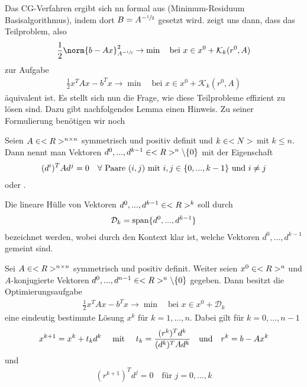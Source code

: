 Das CG-Verfahren ergibt sich nn formal aus  (Minimum-Residuum Basisalgorithmus), indem dort $B=A^{-\sfrac{1}{2}}$ gesetzt wird.  zeigt uns dann, dass das Teilproblem, also
\begin{align}
	\label{2_13}
	\frac{1}{2}\norm{b-Ax}^2_{A^{-\sfrac{1}{2}}}\to\min\quad\text{bei } x\in x^0+\mathcal{K}_k(r^0,A)
\end{align}
zur Aufgabe
\begin{align}
	\label{2_14}
	\frac{1}{2}x^TAx-b^Tx\to\min\quad\text{bei } x\in x^0+\mathcal{K}_k(r^0,A)
\end{align}
äquivalent ist. Es stellt sich nun die Frage, wie diese Teilprobleme effizient zu lösen sind. Dazu gibt nachfolgendes Lemma einen Hinweis. Zu seiner Formulierung benötigen wir noch

\begin{definition}
	Seien $A\in<R>^{n \times n}$ symmetrisch und positiv definit und $k\in<N>$ mit $k\le n$. Dann nennt man Vektoren $d^0,...,d^{k-1}\in<R>^n\backslash\{0\}$ mit der Eigenschaft
	\begin{align}
		(d^i)^TAd^j=0\quad\forall\text{ Paare } (i,j) \text{ mit } i,j\in\{0,...,k-1\} \text{ und } i\neq j\notag
	\end{align}
	 oder .
\end{definition}

Die lineare Hülle von Vektoren $d^0,...,d^{k-1}\in<R>^k$ soll durch 
\begin{align}
	\mathcal{D}_k=\operatorname{span}\{d^0,...,d^{k-1}\}\notag
\end{align}
bezeichnet werden, wobei durch den Kontext klar ist, welche Vektoren $d^0,...,d^{k-1}$ gemeint sind.

\begin{lemma}
	Sei $A\in<R>^{n \times n}$ symmetrisch und positiv definit. Weiter seien $x^0\in<R>^n$ und $A$-konjugierte Vektoren $d^0,...,d^{n-1}\in<R>^n\backslash\{0\}$ gegeben. Dann besitzt die Optimierungsaufgabe
	\begin{align}
		\label{2_15}
		\frac{1}{2}x^TAx-b^Tx\to\min\quad\text{bei } x\in x^0+\mathcal{D}_k
	\end{align}
	eine eindeutig bestimmte Lösung $x^k$ für $k=1,...,n$. Dabei gilt für $k=0,...,n-1$
	\begin{align}
		\label{2_16}
		x^{k+1} = x^k + t_kd^k\quad\mit\quad t_k = \frac{(r^k)^Td^k}{(d^k)^TAd^k}\quad\text{und}\quad r^k=b-Ax^k
	\end{align}
	und
	\begin{align}
		\label{2_17}
		(r^{k+1})^Td^j = 0\quad\text{für } j=0,...,k
	\end{align}
\end{lemma}

